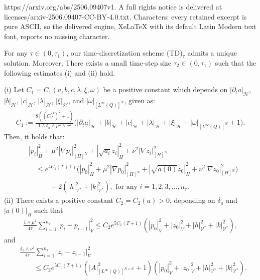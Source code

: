\documentclass[10pt,a4paper]{amsart}
\def\sH{\mathscr{H}}
\def\sV{\mathscr{V}}
\begin{document}
https://arxiv.org/abs/2506.09407v1. A full rights notice is delivered at licenses/arxiv-2506.09407-CC-BY-4.0.txt. Characters: every retained excerpt is pure ASCII, so the delivered engine, XeLaTeX with its default Latin Modern text font, reports no missing character.
\begin{keylem} \label{lem:P_est}
  For any $\tau \in (0,\tau_1)$, our time-discretization scheme (TD)$_\tau$ admits a unique solution. Moreover, There exists a small time-step size $\tau_2 \in (0,\tau_1)$ such that the following estimates (i) and (ii) hold.
  
  \smallskip
  \noindent
  (i) Let $C_1 = C_1(a,b,c,\lambda,\xi,\omega)$ be a positive constant which depends on $|\partial_t a|_\sH$, $|b|_\sH$, $|c|_\sH$, $|\lambda|_\sH$, $|\xi|_\sH$, and $|\omega|_{[L^\infty(Q)]^N}$, given as:
  \begin{gather}
    C_1 := \frac{8((C_V^{L^4})^2 + 1)}{1 \wedge \delta_a \wedge \mu^2 \wedge \nu^2}\bigl( |\partial_t a|_\sH + |b|_\sH + |c|_\sH + |\lambda|_\sH + |\xi|_\sH + |\omega|_{[L^\infty(Q)]^N} + 1\bigr).
  \end{gather}
  Then, it holds that:
  \begin{align}
    &|p_i|_H^2 + \mu^2 |\nabla p_i|_{[H]^N}^2 + |\sqrt{a_i}z_i|_H^2 + \nu^2 |\nabla z_i|_{[H]^N}^2 
    \\
    &\quad \leq e^{4 C_1 (T + 1)} \bigl( |p_0|_H^2 + \mu^2 |\nabla p_0|_{[H]^N}^2 + |\sqrt{a(0)}z_0|_H^2 + \nu^2 |\nabla z_0|_{[H]^N}^2 \bigr)
    \\
    &\quad\qquad + 2(|h|_{\sV^*}^2 + |k|_{\sV^*}^2), \mbox{ for any } i = 1,2,3,\dots, n_\tau. \label{P_TD_est1}
  \end{align}
  (ii) There exists a positive constant $C_2 = C_2(a) > 0$, depending on $\delta_a$ and $|a(0)|_H$ such that
  \begin{gather}
    \frac{1 \wedge \mu^2}{4\tau}\sum_{i=1}^{n_\tau} |p_i - p_{i-1}|_V^2 \leq C_2 e^{5C_1 (T + 1)} (|p_0|_V^2 + |z_0|_V^2 + |h|_{\sV^*}^2 + |k|_{\sV^*}^2), \label{P_TD_est2}
  \end{gather}
  and
  \begin{align}
    &\frac{\delta_a \wedge \nu^2}{4\tau}\sum_{i=1}^{n_\tau} |z_i - z_{i-1}|_V^2 
    \\
    &\qquad \leq C_2 e^{5 C_1 (T + 1)}(|A|_{[L^\infty(Q)]^{N \times N}}^2 + 1) (|p_0|_V^2 + |z_0|_V^2 + |h|_{\sV^*}^2 + |k|_{\sV^*}^2). \label{P_TD_est3}
  \end{align}
\end{keylem}
\end{document}

